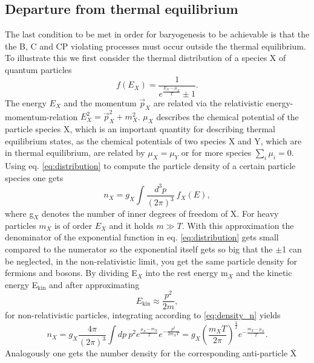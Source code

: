 \subsection{Departure from thermal equilibrium}
The last condition to be met in order for baryogenesis to be achievable is that the the B, C and CP violating processes must occur outside the thermal equilibrium. To illustrate this we first consider the thermal distribution of a species X of quantum particles
\begin{equation}
	f(E_X)=\frac{1}{e^{\frac{E_X-\mu_X}{T}}\pm1}.
	\label{eq:distribution}
\end{equation}
The energy $E_X$ and the momentum $\vec{p}_X$ are related via the relativistic energy-momentum-relation $E_X^2=\vec{p}_X^2+m_X^2$. $\mu_X$ describes the chemical potential of the particle species X, which is an important quantity for describing thermal equilibrium states, as the chemical potentials of two species X and Y, which are in thermal equilibrium, are related by $\mu_X=\mu_Y$ or for more species $\sum_i\mu_i=0$.\newline\indent
Using eq. \eqref{eq:distribution} to compute the particle density of a certain particle species one gets 
\begin{equation}
	n_X=g_X\int\frac{d^3p}{(2\pi)^3}\:f_X(E),
	\label{eq:density_n}
\end{equation}
where g$_X$ denotes the number of inner degrees of freedom of X. \newline\indent
For heavy particles $m_X$ is of order $E_X$ and it holds $m\gg T$. With this approximation the denominator of the exponential function in eq. \eqref{eq:distribution} gets small compared to the numerator so the exponential itself gets so big that the $\pm$1 can be neglected, in the non-relativistic limit, you get the same particle density for fermions and bosons. By dividing E$_X$ into the rest energy m$_X$ and the kinetic energy E$_{\text{kin}}$ and after approximating
\begin{equation}
	E_{\text{kin}}\approx\frac{p^2}{2m},
\end{equation}
for non-relativistic particles, integrating according to \eqref{eq:density_n} yields
\begin{equation}
n_X=g_X\frac{4\pi}{(2\pi)^3}\int dp\:p^2e^\frac{\mu_X-m_X}{T}e^{-\frac{p^2}{2m_XT}}=g_X\left(\frac{m_XT}{2\pi}\right)^\frac{3}{2}e^{-\frac{m_X-\mu_X}{T}}.
\label{eq:numerX}
\end{equation}
Analogously one gets the number density for the corresponding anti-particle $\bar{\text{X}}$
